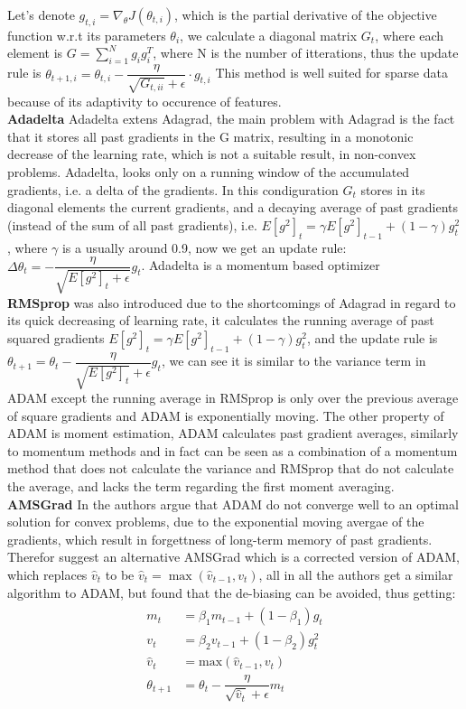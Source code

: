 \documentclass[10pt,a4paper]{article}
\begin{document}
Let's denote $g_{t, i} = \nabla_\theta J( \theta_{t, i} )$, which is the partial derivative of the objective function w.r.t its parameters $\theta_i$, we calculate a diagonal matrix $G_t$, where each element is $G=\sum_{i=1}^{N} g_i g_i^T$, where N is the number of itterations, thus the update rule is $\theta_{t+1, i} = \theta_{t, i} - \dfrac{\eta}{\sqrt{G_{t, ii}} + \epsilon} \cdot g_{t, i}$
This method is well suited for sparse data because of its adaptivity to occurence of features.
\\
\textbf{Adadelta} 
Adadelta extens Adagrad, the main problem with Adagrad is the fact that it stores all past gradients in the G matrix, resulting in a monotonic decrease of the learning rate, which is not a suitable result, in non-convex problems. Adadelta, looks only on a running window of the accumulated gradients, i.e. a delta of the gradients.
In this condiguration $G_t$ stores in its diagonal elements the current gradients, and a decaying average of past gradients (instead of the sum of all past gradients), i.e. $ E[g^2]_t = \gamma E[g^2]_{t-1} + (1 - \gamma) g^2_t$, where $\gamma$ is a usually around 0.9, now we get an update rule: $\Delta \theta_t = - \dfrac{\eta}{\sqrt{E[g^2]_t + \epsilon}} g_{t}$. Adadelta is a momentum based optimizer
\\
\textbf{RMSprop} was also introduced due to the shortcomings of Adagrad in regard to its quick decreasing of learning rate, it calculates the running average of past squared gradients $E[g^2]_t = \gamma E[g^2]_{t-1} + (1 - \gamma) g^2_t$, and the update rule is $\theta_{t+1} = \theta_{t} - \dfrac{\eta}{\sqrt{E[g^2]_t} + \epsilon} g_{t}$, we can see it is similar to the variance term in ADAM except the running average in RMSprop is only over the previous average of square gradients and ADAM is exponentially moving.
The other property of ADAM is moment estimation, ADAM calculates past gradient averages, similarly to momentum methods and in fact can be seen as a combination of a momentum method that does not calculate the variance and RMSprop that do not calculate the average, and lacks the term regarding the first moment averaging.\\
\textbf{AMSGrad} In \cite{reddi2019convergence} the authors argue that ADAM do not converge well to an optimal solution for convex problems, due to the exponential moving avergae of the gradients, which result in forgettness of long-term memory of past gradients. Therefor suggest an alternative AMSGrad which is a corrected version of ADAM, which replaces $\hat{v}_t$ to be $\hat{v}_t = \max(\hat{v}_{t-1}, v_t)$, all in all the authors get a similar algorithm to ADAM, but found that the de-biasing can be avoided, thus getting:
\begin{align} 
    \begin{split} 
    m_t &= \beta_1 m_{t-1} + (1 - \beta_1) g_t \\ 
    v_t &= \beta_2 v_{t-1} + (1 - \beta_2) g_t^2\\ 
    \hat{v}_t &= \text{max}(\hat{v}_{t-1}, v_t) \\ 
    \theta_{t+1} &= \theta_{t} - \dfrac{\eta}{\sqrt{\hat{v}_t} + \epsilon} m_t 
    \end{split} 
\end{align}
    
\end{document}
